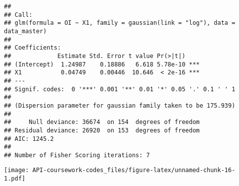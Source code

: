 \documentclass[
]{article}
\newenvironment{Shaded}{\begin{snugshade}}{\end{snugshade}}
\newcommand{\AttributeTok}[1]{\textcolor[rgb]{0.13,0.29,0.53}{#1}}
\newcommand{\CommentTok}[1]{\textcolor[rgb]{0.56,0.35,0.01}{\textit{#1}}}
\newcommand{\DecValTok}[1]{\textcolor[rgb]{0.00,0.00,0.81}{#1}}
\newcommand{\FunctionTok}[1]{\textcolor[rgb]{0.13,0.29,0.53}{\textbf{#1}}}
\newcommand{\NormalTok}[1]{#1}
\newcommand{\OtherTok}[1]{\textcolor[rgb]{0.56,0.35,0.01}{#1}}
\newcommand{\SpecialCharTok}[1]{\textcolor[rgb]{0.81,0.36,0.00}{\textbf{#1}}}
\newcommand{\StringTok}[1]{\textcolor[rgb]{0.31,0.60,0.02}{#1}}
\begin{document}
\begin{verbatim}
## 
## Call:
## glm(formula = OI ~ X1, family = gaussian(link = "log"), data = data_master)
## 
## Coefficients:
##             Estimate Std. Error t value Pr(>|t|)    
## (Intercept)  1.24987    0.18886   6.618 5.78e-10 ***
## X1           0.04749    0.00446  10.646  < 2e-16 ***
## ---
## Signif. codes:  0 '***' 0.001 '**' 0.01 '*' 0.05 '.' 0.1 ' ' 1
## 
## (Dispersion parameter for gaussian family taken to be 175.939)
## 
##     Null deviance: 36674  on 154  degrees of freedom
## Residual deviance: 26920  on 153  degrees of freedom
## AIC: 1245.2
## 
## Number of Fisher Scoring iterations: 7
\end{verbatim}

\begin{Shaded}
\end{Shaded}

\texttt{[image: API-coursework-codes\_files/figure-latex/unnamed-chunk-16-1.pdf]}

\begin{Shaded}
\end{Shaded}
\end{document}
